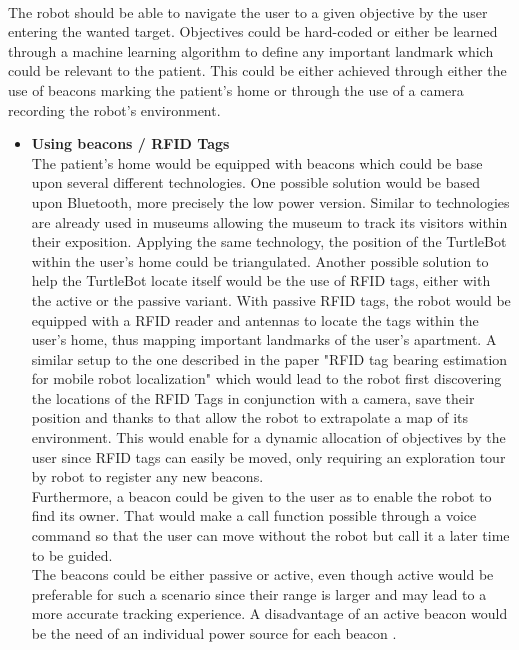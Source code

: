 \documentclass[plainarticle,zihtitle,english,final,hyperref,utf8]{zihpub}
\begin{document}
\\
\newline
The robot should be able to navigate the user to a given objective by the user entering the wanted target. Objectives could be hard-coded or either be learned through a machine learning algorithm to define any important landmark which could be relevant to the patient. This could be either achieved through either the use of beacons marking the patient’s home or through the use of a camera recording the robot's environment. 
\begin{itemize}
\item \textbf{Using beacons / RFID Tags}\\
The patient's home would be equipped with beacons which could be base upon several different technologies. One possible solution would be based upon Bluetooth, more precisely the low power version. Similar to technologies are already used in museums \cite{8203530} allowing the museum to track its visitors within their exposition. Applying the same technology, the position of the TurtleBot within the user's home could be triangulated. Another possible solution to help the TurtleBot locate itself would be the use of RFID tags, either with the active or the passive variant. With passive RFID tags, the robot would be equipped with a RFID reader and antennas to locate the tags within the user's home, thus mapping important landmarks of the user's apartment. A similar setup to the one described in the paper "RFID tag bearing estimation for mobile robot localization" \cite{5174666} which would lead to the robot first discovering the locations of the RFID Tags in conjunction with a camera, save their position and thanks to that allow the robot to extrapolate a map of its environment. This would enable for a dynamic allocation of objectives by the user since RFID tags can easily be moved, only requiring an exploration tour by robot to register any new beacons.\\
\newline
Furthermore, a beacon could be given to the user as to enable the robot to find its owner. That would make a call function possible through a voice command so that the user can move without the robot but call it a later time to be guided.\\
\newline
The beacons could be either passive or active, even though active would be preferable for such a scenario since their range is larger and may lead to a more accurate tracking experience. A disadvantage of an active beacon would be the need of an individual power source for each beacon \cite{4560133}. \\

\end{itemize}
\end{document}
